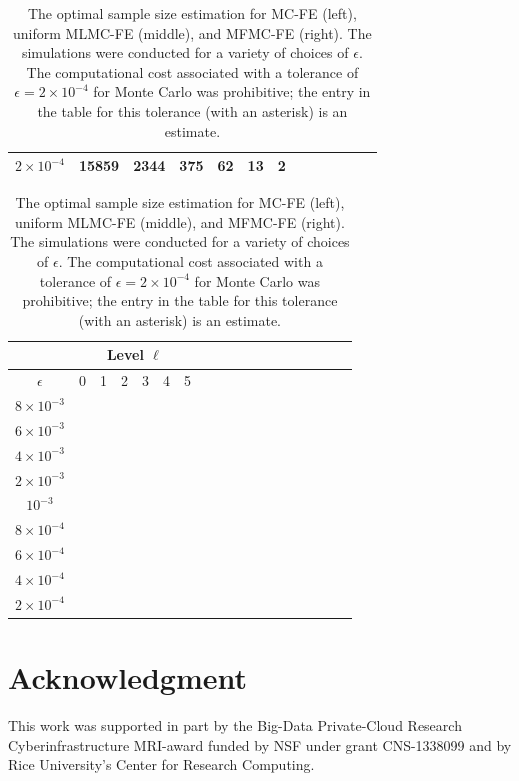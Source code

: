 \documentclass[final,3p,times,11pt]{elsarticle}
\begin{document}
\begin{table}[ht]
{\begin{tabular}{c|c|c|c|c|c|c|c|c|c|c|c|c|}
                \multicolumn{1}{|c|}{$2\times 10^{-4} $}&15859        &2344         &375          &62          &13           &2\\
			\hline
	\end{tabular}
 \qquad
		\begin{tabular}{c|c|c|c|c|c|c|c|c|c|c|c|c|c|c|c|c|c|}
	    \cline{2-7}	
		&\multicolumn{6}{|c|}{ Level $\ell$}\\
			\hline
			\multicolumn{1}{|c|}{$\epsilon$}&0&1&2&3&4&5\\
			\hline
			\multicolumn{1}{|c|}{$8\times 10^{-3} $}&&&&&&\\
			\multicolumn{1}{|c|}{$6\times 10^{-3} $}&&&&&&\\
			\multicolumn{1}{|c|}{$4\times 10^{-3} $}&&&&&&\\
			\multicolumn{1}{|c|}{$2\times 10^{-3} $}&&&&&&\\
			\multicolumn{1}{|c|}{$10^{-3} $}&&&&&&\\
			\multicolumn{1}{|c|}{$8\times 10^{-4} $}&&&&&&\\
                \multicolumn{1}{|c|}{$6\times 10^{-4} $}&&&&&&\\
			\multicolumn{1}{|c|}{$4\times 10^{-4} $}&&&&&&\\
                \multicolumn{1}{|c|}{$2\times 10^{-4} $}&&&&&&\\
			\hline
	\end{tabular}
 
 }
	\caption{The optimal sample size estimation for MC-FE (left), uniform MLMC-FE (middle), and MFMC-FE (right). The simulations were conducted for a variety of choices of $\epsilon$. The computational cost associated with a tolerance of $\epsilon = 2\times 10^{-4}$ for Monte Carlo was prohibitive; the entry in the table for this tolerance (with an asterisk) is an estimate.}
	\label{Tab:SampleSize}
\end{table}


\section{Acknowledgment}\label{sec:Acknowledgment}

This work was supported in part by the Big-Data Private-Cloud Research Cyberinfrastructure MRI-award funded by NSF under grant CNS-1338099 and by Rice University's Center for Research Computing.



\end{document}
